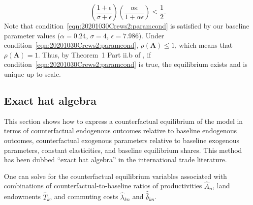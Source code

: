 \documentclass[11pt]{article}
\theoremstyle{definition}
\begin{document}
   
   
\begin{equation}
    \label{eqn:20201030Crews2:paramcond}
    \left(\frac{1+\epsilon}{\sigma + \epsilon}\right) \left(\frac{\alpha \epsilon}{1+\alpha \epsilon}\right) \leq \frac{1}{2}.
\end{equation}
Note that condition~\eqref{eqn:20201030Crews2:paramcond}
is satisfied by our baseline parameter values
($\alpha = 0.24$, $\sigma = 4$, $\epsilon = 7.986$).
Under condition~\eqref{eqn:20201030Crews2:paramcond}, $\rho(\mathbf{A}) \leq 1$,
which means that $\rho(\mathbf{A}) = 1$.
Thus, by Theorem~1 Part ii.b of ,
if condition~\eqref{eqn:20201030Crews2:paramcond} is true,
the equilibrium exists and is unique up to scale.
\subsection{Exact hat algebra}\label{sec:appendix:theory:exacthatalgebra}

This section shows how to express a counterfactual equilibrium of the model in terms of
counterfactual endogenous outcomes relative to baseline endogenous outcomes,
counterfactual exogenous parameters relative to baseline exogenous parameters,
constant elasticities, 
and
baseline equilibrium shares.
This method has been dubbed ``exact hat algebra'' in the international trade literature.


One can solve for the counterfactual equilibrium variables associated with
combinations of counterfactual-to-baseline ratios of productivities $\hat{A}_{n}$, land endowments $\hat{T}_{k}$, and commuting costs $\hat{ \lambda}_{kn}$ and $\hat{\bar{\delta}}_{kn} $.
\end{document}
